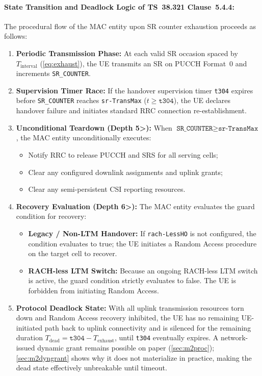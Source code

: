 \paragraph{State Transition and Deadlock Logic of TS~38.321 Clause~5.4.4:}
The procedural flow of the MAC entity upon SR counter exhaustion proceeds as follows:
\begin{enumerate}\itemsep1pt
  \item \textbf{Periodic Transmission Phase:} At each valid SR occasion spaced by $T_{\text{interval}}$ (\cref{eq:exhaust}), the UE transmits an SR on PUCCH Format~0 and increments \texttt{SR\_COUNTER}.
  \item \textbf{Supervision Timer Race:} If the handover supervision timer \texttt{t304} expires before \texttt{SR\_COUNTER} reaches \texttt{sr-TransMax} ($t \ge \texttt{t304}$), the UE declares handover failure and initiates standard RRC connection re-establishment.
  \item \textbf{Unconditional Teardown (Depth 5>):} When $\texttt{SR\_COUNTER} \ge \texttt{sr-TransMax}$, the MAC entity unconditionally executes:
    \begin{itemize}\itemsep0pt
      \item Notify RRC to release PUCCH and SRS for all serving cells;
      \item Clear any configured downlink assignments and uplink grants;
      \item Clear any semi-persistent CSI reporting resources.
    \end{itemize}
  \item \textbf{Recovery Evaluation (Depth 6>):} The MAC entity evaluates the guard condition for recovery:
    \begin{itemize}\itemsep0pt
      \item \textbf{Legacy / Non-LTM Handover:} If \texttt{rach-LessHO} is not configured, the condition evaluates to true; the UE initiates a Random Access procedure on the target cell to recover.
      \item \textbf{RACH-less LTM Switch:} Because an ongoing RACH-less LTM switch is active, the guard condition strictly evaluates to false. The UE is forbidden from initiating Random Access.
    \end{itemize}
  \item \textbf{Protocol Deadlock State:} With all uplink transmission resources torn down and Random Access recovery inhibited, the UE has no remaining UE-initiated path back to uplink connectivity and is silenced for the remaining duration $T_{\text{dead}} = \texttt{t304} - T_{\text{exhaust}}$, until \texttt{t304} eventually expires. A network-issued dynamic grant remains possible on paper (\cref{sec:m2proc}); \cref{sec:m2dyngrant} shows why it does not materialize in practice, making the dead state effectively unbreakable until timeout.
\end{enumerate}

